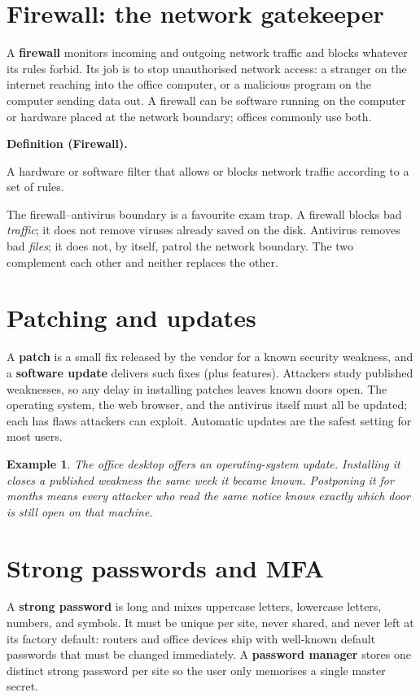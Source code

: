 \documentclass[11pt]{article}
\newtheorem{example}{Example}[section]
\newenvironment{definitionbox}[1]{%
  \par\noindent\textbf{Definition (#1).}\ \itshape
}{\par\vspace{0.3em}}
\begin{document}
\section{Firewall: the network gatekeeper}
A \textbf{firewall} monitors incoming and outgoing network traffic and blocks
whatever its rules forbid. Its job is to stop unauthorised network access: a
stranger on the internet reaching into the office computer, or a malicious
program on the computer sending data out. A firewall can be software running
on the computer or hardware placed at the network boundary; offices commonly
use both.

\begin{definitionbox}{Firewall}
A hardware or software filter that allows or blocks network traffic
according to a set of rules.
\end{definitionbox}

The firewall--antivirus boundary is a favourite exam trap. A firewall blocks
bad \emph{traffic}; it does not remove viruses already saved on the disk.
Antivirus removes bad \emph{files}; it does not, by itself, patrol the network
boundary. The two complement each other and neither replaces the other.

\section{Patching and updates}
A \textbf{patch} is a small fix released by the vendor for a known security
weakness, and a \textbf{software update} delivers such fixes (plus features).
Attackers study published weaknesses, so any delay in installing patches
leaves known doors open. The operating system, the web browser, and the
antivirus itself must all be updated; each has flaws attackers can exploit.
Automatic updates are the safest setting for most users.

\begin{example}
The office desktop offers an operating-system update. Installing it closes a
published weakness the same week it became known. Postponing it for months
means every attacker who read the same notice knows exactly which door is
still open on that machine.
\end{example}

\section{Strong passwords and MFA}
A \textbf{strong password} is long and mixes uppercase letters, lowercase
letters, numbers, and symbols. It must be unique per site, never shared, and
never left at its factory default: routers and office devices ship with
well-known default passwords that must be changed immediately. A
\textbf{password manager} stores one distinct strong password per site so the
user only memorises a single master secret.
\end{document}
